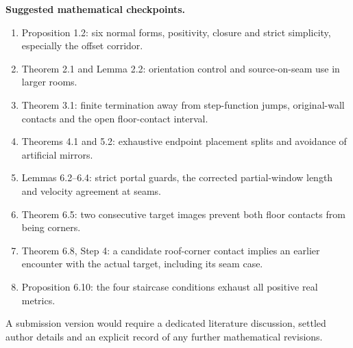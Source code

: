\documentclass[11pt]{article}
\begin{document}
\textbf{Suggested mathematical checkpoints.}
\begin{enumerate}
\item Proposition 1.2: six normal forms, positivity, closure and strict simplicity, especially the offset corridor.
\item Theorem 2.1 and Lemma 2.2: orientation control and source-on-seam use in larger rooms.
\item Theorem 3.1: finite termination away from step-function jumps, original-wall contacts and the open floor-contact interval.
\item Theorems 4.1 and 5.2: exhaustive endpoint placement splits and avoidance of artificial mirrors.
\item Lemmas 6.2--6.4: strict portal guards, the corrected partial-window length and velocity agreement at seams.
\item Theorem 6.5: two consecutive target images prevent both floor contacts from being corners.
\item Theorem 6.8, Step 4: a candidate roof-corner contact implies an earlier encounter with the actual target, including its seam case.
\item Proposition 6.10: the four staircase conditions exhaust all positive real metrics.
\end{enumerate}
A submission version would require a dedicated literature discussion, settled author details and an explicit record of any further mathematical revisions.

\clearpage
\end{document}
